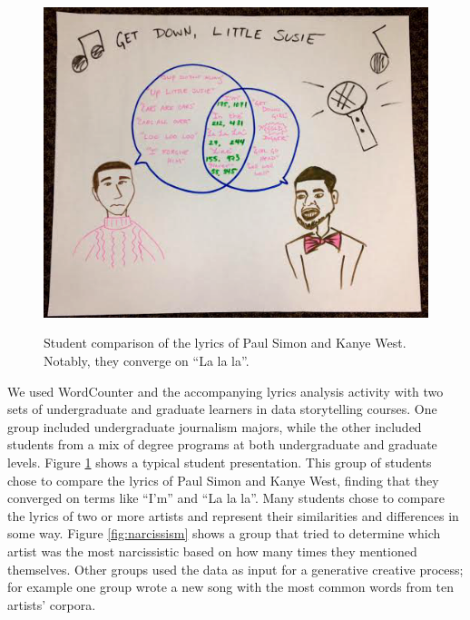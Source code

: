 \documentclass{acm_proc_article-sp}
\begin{document}
\begin{figure}[h]
\caption{Student comparison of the lyrics of Paul Simon and Kanye West. Notably, they converge on \enquote{La la la}.}
\includegraphics[width=\linewidth]{KanyePaulSimon}
\label{fig:KanyePaulSimon}
\end{figure}

We used WordCounter and the accompanying lyrics analysis activity with two sets of undergraduate and graduate learners in data storytelling courses. One group included undergraduate journalism majors, while the other included students from a mix of degree programs at both undergraduate and graduate levels. Figure \ref{fig:KanyePaulSimon} shows a typical student presentation. This group of students chose to compare the lyrics of Paul Simon and Kanye West, finding that they converged on terms like \enquote{I'm} and \enquote{La la la}. Many students chose to compare the lyrics of two or more artists and represent their similarities and differences in some way. Figure \ref{fig:narcissism} shows a group that tried to determine which artist was the most narcissistic based on how many times they mentioned themselves. Other groups used the data as input for a generative creative process; for example one group wrote a new song with the most common words from ten artists' corpora. 
\end{document}

